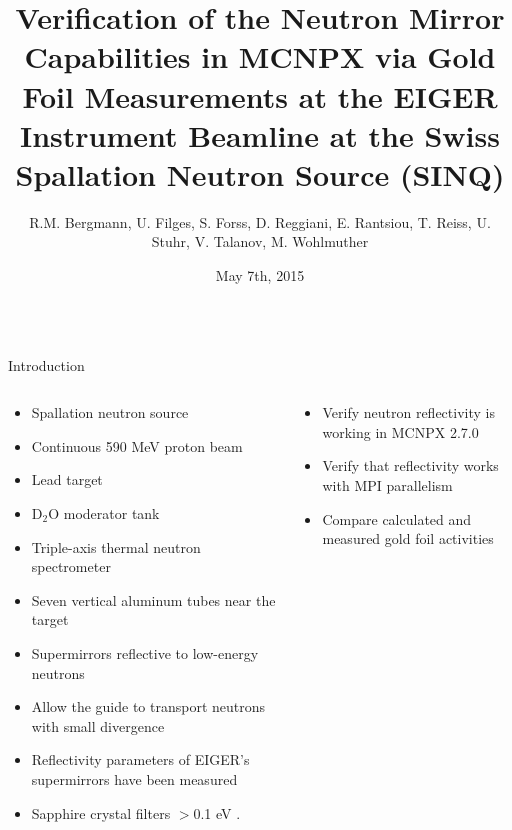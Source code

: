 \documentclass[final,t]{beamer}
\title{\huge Verification of the Neutron Mirror Capabilities in MCNPX via Gold Foil Measurements at the EIGER Instrument Beamline at the Swiss Spallation Neutron Source (SINQ) } %
\author{R.M. Bergmann, U. Filges, S. Forss, D. Reggiani, E. Rantsiou, T. Reiss, U. Stuhr, V. Talanov, M. Wohlmuther} %
\institute[PSI]{Paul Scherrer Institut, Villigen, Switzerland}
\date[May 7th, 2015]{May 7th, 2015}
\begin{document}
\begin{frame}{} 
  \begin{columns}[t]
    \begin{column}{.3\linewidth}


      \begin{block}{Introduction}

\begin{columns}
\begin{column}{.6\linewidth}
\begin{itemize}
  \item Spallation neutron source
  \item Continuous 590 MeV proton beam
  \item Lead target
  \item D$_2$O moderator tank  
\end{itemize}

\begin{itemize}
\item Triple-axis thermal neutron spectrometer 
\end{itemize}

\begin{itemize}
\item Seven vertical aluminum tubes near the target 
\end{itemize}

  \begin{itemize} 
  \item Supermirrors reflective to low-energy neutrons
  \item Allow the guide to transport neutrons with small divergence
  \item Reflectivity parameters of EIGER's supermirrors have been measured
  \item Sapphire crystal filters $>$0.1 eV \cite{freund}.
  \end{itemize}
\end{column}

\begin{column}{.4\linewidth}
  \begin{itemize}
  \item Verify neutron reflectivity is working in MCNPX 2.7.0
  \item Verify that reflectivity works with MPI parallelism
  \item Compare calculated and measured gold foil activities
  \end{itemize}


\end{column}
\end{columns}
\end{block}
\end{column}
\end{columns}
\end{frame}
\end{document}
